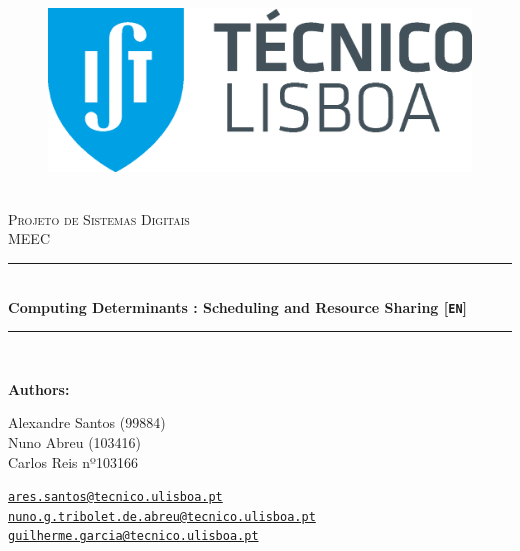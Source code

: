 \documentclass[12pt]{article}
\newcommand{\HRule}{\rule{\linewidth}{0.5mm}} %
\begin{document}
\begin{center}
    \begin{figure}
        \vspace{-1.0cm}
        \includegraphics[scale = 0.3, left]{Imagens/IST_A.eps} %
    \end{figure}
    \mbox{}\\[2.0cm]
    \textsc{\Huge Projeto de Sistemas Digitais}\\[2.5cm]
    \textsc{\LARGE MEEC}\\[2.0cm]
    \HRule\\[0.4cm]
    {\large \bf {\selectfont Computing Determinants : Scheduling and Resource Sharing} [\texttt{EN}]}\\[0.2cm]
    \HRule\\[1.5cm]
\end{center}

\begin{flushleft}
    \textbf{\selectfont Authors:}
\end{flushleft}

\begin{center}
    \begin{minipage}{0.4\textwidth}
        \begin{flushleft}
            Alexandre Santos (99884)\\
            Nuno Abreu (103416)\\
            Carlos Reis nº103166 \\
        \end{flushleft}
    \end{minipage}%
    \begin{minipage}{0.6\textwidth}
        \begin{flushright}
            \href{mailto:ares.santos@tecnico.ulisboa.pt}{\texttt{ares.santos@tecnico.ulisboa.pt}}\\
            \href{mailto:nuno.g.tribolet.de.abreu@tecnico.ulisboa.pt}{\texttt{nuno.g.tribolet.de.abreu@tecnico.ulisboa.pt}}\\
            \href{mailto:guilherme.garcia@tecnico.ulisboa.pt}{\texttt{guilherme.garcia@tecnico.ulisboa.pt}}\\
            
        \end{flushright}
    \end{minipage}


\end{center}
    
\end{document}
